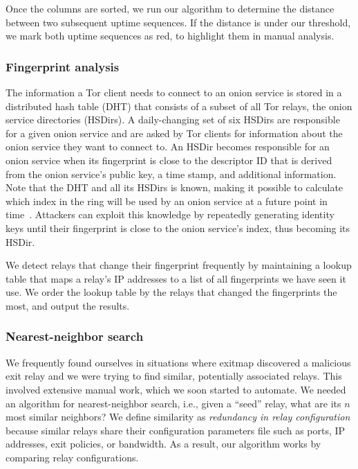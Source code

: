 Once the columns are sorted, we run our algorithm to determine the distance
between two subsequent uptime sequences.  If the distance is under our
threshold, we mark both uptime sequences as red, to highlight them in manual
analysis.

\subsubsection{Fingerprint analysis}
\label{sec:fingerprint-analysis}
The information a Tor client needs to connect to an onion service is stored in a
distributed hash table (DHT) that consists of a subset of all Tor
relays, the onion service directories (HSDirs).  A daily-changing set of six
HSDirs are responsible for a given onion service and are asked by Tor clients
for information about the onion service they want to connect to.  An HSDir
becomes responsible for an onion service when its fingerprint is close to the
descriptor ID that is derived from the onion service's public key, a time stamp,
and additional information.
Note that the DHT and all its HSDirs is known, making it possible to calculate
which index in the ring will be used by an onion service at a future point in
time~\cite{Biryukov2013a}.  Attackers can exploit this knowledge by repeatedly
generating identity keys until their fingerprint is close to the onion service's
index, thus becoming its HSDir.

We detect relays that change their fingerprint frequently by maintaining a
lookup table that maps a relay's IP addresses to a list of all fingerprints we
have seen it use.  We order the lookup table by the relays that changed the
fingerprints the most, and output the results.

\subsubsection{Nearest-neighbor search}
\label{sec:nearest-neighbor}
We frequently found ourselves in situations where exitmap discovered a malicious
exit relay and we were trying to find similar, potentially associated relays.
This involved extensive manual work, which we soon started to automate.  We
needed an algorithm for nearest-neighbor search, i.e., given a ``seed'' relay,
what are its $n$ most similar neighbors?  We define similarity as
\emph{redundancy in relay configuration} because similar relays share their
configuration parameters file such as ports, IP addresses, exit policies, or
bandwidth.  As a result, our algorithm works by comparing relay configurations.


